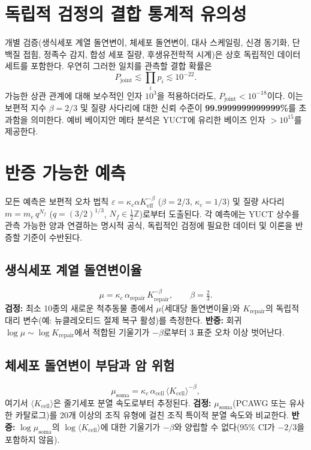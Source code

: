 \documentclass[11pt,a4paper]{article}
\begin{document}
	\section{독립적 검정의 결합 통계적 유의성}
	
	개별 검증(생식세포 계열 돌연변이, 체세포 돌연변이, 대사 스케일링, 신경 동기화, 단백질 접힘, 정족수 감지, 합성 세포 질량, 후생유전학적 시계)은 상호 독립적인 데이터 세트를 포함한다. 우연히 그러한 일치를 관측할 결합 확률은
	\[
	P_{\text{joint}} \lesssim \prod_i p_i \lesssim 10^{-22}.
	\]
	가능한 상관 관계에 대해 보수적인 인자 \(10^3\)을 적용하더라도, \(P_{\text{joint}} < 10^{-18}\)이다. 이는 보편적 지수 \(\beta=2/3\) 및 질량 사다리에 대한 신뢰 수준이 \textbf{99.9999999999999\%}를 초과함을 의미한다. 예비 베이지안 메타 분석은 YUCT에 유리한 베이즈 인자 \(>10^{15}\)를 제공한다.
	
	\section{반증 가능한 예측}
	
	모든 예측은 보편적 오차 법칙
	\(\varepsilon = \kappa_c \alpha K_{\mathrm{eff}}^{-\beta}\)
	(\(\beta=2/3\), \(\kappa_c=1/3\)) 및 질량 사다리
	\(m = m_e\,q^{N_f}\) (\(q=(3/2)^{1/3}\), \(N_f\in\tfrac12\mathbb{Z}\))로부터 도출된다.
	각 예측에는 YUCT 상수를 관측 가능한 양과 연결하는 명시적 공식, 독립적인 검정에 필요한 데이터 및 이론을 반증할 기준이 수반된다.
	
	\subsection{생식세포 계열 돌연변이율}
	
	\begin{equation}\label{eq:pred-mutation}
		\mu = \kappa_c\,\alpha_{\mathrm{repair}}\,
		K_{\mathrm{repair}}^{-\beta}, \qquad \beta = \tfrac23 .
	\end{equation}
	\textbf{검정:} 최소 10종의 새로운 척추동물 종에서 \(\mu\)(세대당 돌연변이율)와 \(K_{\mathrm{repair}}\)의 독립적 대리 변수(예: 뉴클레오티드 절제 복구 활성)를 측정한다.
	\textbf{반증:} 회귀 \(\log\mu \sim \log K_{\mathrm{repair}}\)에서 적합된 기울기가 \(-\beta\)로부터 3 표준 오차 이상 벗어난다.
	
	\subsection{체세포 돌연변이 부담과 암 위험}
	
	\begin{equation}\label{eq:pred-somatic}
		\mu_{\mathrm{soma}} = \kappa_c\,\alpha_{\mathrm{cell}}\,
		\langle K_{\mathrm{cell}}\rangle^{-\beta},
	\end{equation}
	여기서 \(\langle K_{\mathrm{cell}}\rangle\)은 줄기세포 분열 속도로부터 추정된다.
	\textbf{검정:} \(\mu_{\mathrm{soma}}\)(PCAWG 또는 유사한 카탈로그)를 20개 이상의 조직 유형에 걸친 조직 특이적 분열 속도와 비교한다.
	\textbf{반증:} \(\log\mu_{\mathrm{soma}}\)의 \(\log\langle K_{\mathrm{cell}}\rangle\)에 대한 기울기가 \(-\beta\)와 양립할 수 없다(95\% CI가 \(-2/3\)을 포함하지 않음).
	
\end{document}
